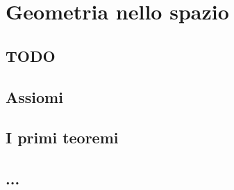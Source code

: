 
\chapter{Geometria nello spazio}

\section{TODO}

\section{Assiomi}
\label{sec:01_assiomi}

% 

\section{I primi teoremi}
\label{sec:02_teoremi}

\section{...}
\label{sec:03_...}


